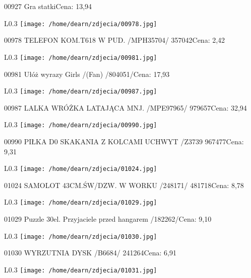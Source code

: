 00927 Gra statkiCena: 13,94\newline
\begin{wrapfigure}{L}{0.3\textwidth}
\texttt{[image: /home/dearn/zdjecia/00978.jpg]}
\end{wrapfigure}
00978 TELEFON KOM.T618 W PUD. /MPH35704/ 357042Cena: 2,42\newline
\begin{wrapfigure}{L}{0.3\textwidth}
\texttt{[image: /home/dearn/zdjecia/00981.jpg]}
\end{wrapfigure}
00981 Ułóż wyrazy Girls /(Fan) /804051/Cena: 17,93\newline
\begin{wrapfigure}{L}{0.3\textwidth}
\texttt{[image: /home/dearn/zdjecia/00987.jpg]}
\end{wrapfigure}
00987 LALKA WRÓŻKA LATAJĄCA MNJ. /MPE97965/           979657Cena: 32,94\newline
\begin{wrapfigure}{L}{0.3\textwidth}
\texttt{[image: /home/dearn/zdjecia/00990.jpg]}
\end{wrapfigure}
00990 PIŁKA D0 SKAKANIA  Z KOLCAMI UCHWYT /Z3739      967477Cena: 9,31\newline
\begin{wrapfigure}{L}{0.3\textwidth}
\texttt{[image: /home/dearn/zdjecia/01024.jpg]}
\end{wrapfigure}
01024 SAMOLOT 43CM.ŚW/DZW. W WORKU  /248171/          481718Cena: 8,78\newline
\begin{wrapfigure}{L}{0.3\textwidth}
\texttt{[image: /home/dearn/zdjecia/01029.jpg]}
\end{wrapfigure}
01029 Puzzle 30el. Przyjaciele przed hangarem  /182262/Cena: 9,10\newline
\begin{wrapfigure}{L}{0.3\textwidth}
\texttt{[image: /home/dearn/zdjecia/01030.jpg]}
\end{wrapfigure}
01030 WYRZUTNIA DYSK  /B6684/                         241264Cena: 6,91\newline
\begin{wrapfigure}{L}{0.3\textwidth}
\texttt{[image: /home/dearn/zdjecia/01031.jpg]}
\end{wrapfigure}
